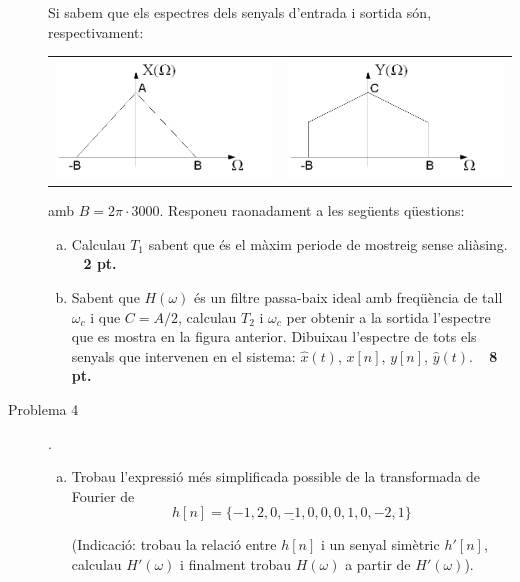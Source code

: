 \documentclass{article}
\begin{document}
\begin{description}
\noindent
Si sabem que els espectres dels senyals d'entrada i sortida s\'on, respectivament:

\begin{center}
\begin{tabular}{cc}
\includegraphics[width=6cm]{inputP3set.png}
&
\includegraphics[width=6cm]{outputP3set.png}
\end{tabular}
\end{center}

\noindent
amb $B=2\pi \cdot 3000$.
Responeu raonadament a les següents qüestions:


\begin{enumerate}[a)]
\item Calculau $T_1$ sabent que és el màxim periode de mostreig sense aliàsing.
 \ \hfill{\textbf{ 2 pt.}}

\item Sabent que $H(\omega)$ és un filtre passa-baix ideal amb freqüència de tall $\omega_c$ i que $C=A/2$,
calculau $T_2$ i $\omega_c$ per obtenir a la sortida l'espectre que es mostra en la figura
anterior. Dibuixau l'espectre de tots els senyals
que intervenen en el sistema: $\hat{x}(t)$, $x[n]$, $y[n]$, $\hat{y}(t)$.
 \ \hfill{\textbf{ 8 pt.}}

\end{enumerate}

\vskip 0.5cm

\item[Problema 4].

\begin{enumerate}[a)]

\item Trobau l'expressió més simplificada possible de la transformada de Fourier de
\[
h[n]=\{ -1, 2, 0, \underline{-1}, 0, 0, 0, 1, 0, -2, 1 \}
\]

\noindent
(Indicació: trobau la relació entre $h[n]$ i un senyal simètric $h'[n]$, calculau $H'(\omega)$ i
finalment trobau $H(\omega)$ a partir de $H'(\omega)$).


\end{enumerate}
\end{description}
\end{document}
